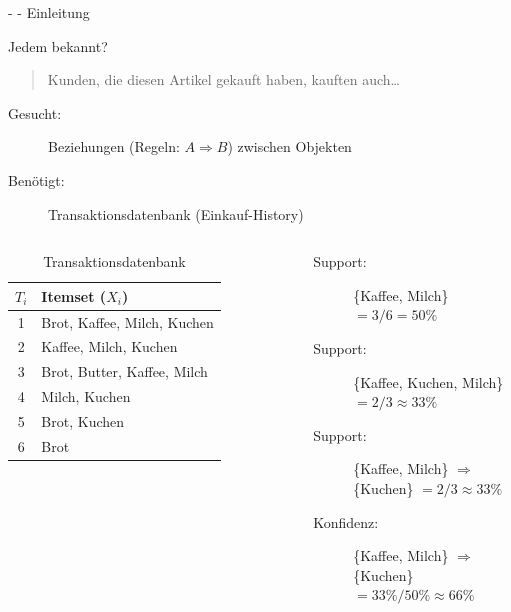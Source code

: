 \documentclass[fleqn,11pt,aspectratio=43]{beamer}
\begin{document}
\begin{frame}{\insertsectionhead - \insertsubsectionhead - Einleitung \cite{ester2000knowledge}}

\begin{alertblock}{Jedem bekannt?}
\begin{quote}
Kunden, die diesen Artikel gekauft haben, kauften auch\ldots
\end{quote}
\end{alertblock}
\pause
\begin{description}
\item[Gesucht:] Beziehungen (Regeln: $A \Rightarrow B$) zwischen Objekten
\item[Benötigt:] Transaktionsdatenbank (Einkauf-History)
\end{description}
\begin{columns}[onlytextwidth]
 \small
    \begin{table}
    	    \hspace{-2em}\begin{tabular}{c|l}
    	    $T_i$ & Itemset ($X_i$)\\ \hline
    	    1 & Brot, Kaffee, Milch, Kuchen\\
    	    2 & Kaffee, Milch, Kuchen\\
    	    3 & Brot, Butter, Kaffee, Milch\\
    	    4 & Milch, Kuchen\\
    	    5 & Brot, Kuchen\\
    	    6 & Brot
    	    \end{tabular}
    	    \caption{\footnotesize Transaktionsdatenbank \cite{ester2000knowledge}}
    	    \end{table}
    	    
    \vspace{-1.2em}
	   \begin{description}
		   \item[Support:] \{Kaffee, Milch\} $= 3 / 6 = 50\%$
		   \item[Support:] \{Kaffee, Kuchen, Milch\} $= 2 / 3 \approx 33\%$
		   \item[Support:] \{Kaffee, Milch\} $\Rightarrow$ \{Kuchen\}  $= 2 / 3 \approx 33\%$
		   \item[Konfidenz:] \{Kaffee, Milch\} $\Rightarrow$ \{Kuchen\} $= 33\% / 50\% \approx 66\%$
	   \end{description}
\end{columns}
\end{frame}
\end{document}
